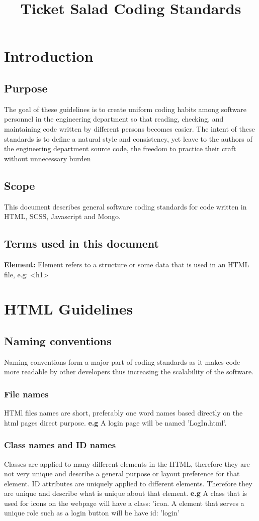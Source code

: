 \documentclass[11pt]{article}
\begin{document}
	\title{Ticket Salad Coding Standards}
	\date{}
	\maketitle
	
	\section{Introduction}
	\subsection{Purpose}
	The goal of these guidelines is to create uniform coding habits among software personnel in the
	engineering department so that reading, checking, and maintaining code written by different persons
	becomes easier. The intent of these standards is to define a natural style and consistency, yet leave
	to the authors of the engineering department source code, the freedom to practice their craft without
	unnecessary burden
	\subsection{Scope}
	This document describes general software coding standards for code written in HTML, SCSS, Javascript and Mongo.
	\subsection{Terms used in this document}
	\textbf{Element: }Element refers to a structure or some data that is used in an HTML file, e.g: <h1>
	\section{HTML Guidelines}
	\subsection{Naming conventions}
	Naming conventions form a major part of coding standards as it makes code more readable by other developers thus increasing the scalability of the software.
	\subsubsection{File names}
	HTMl files names are short, preferably one word names based directly on the html pages direct purpose.
	\textbf{e.g} A login page will be named 'LogIn.html'. 
	\subsubsection{Class names and ID names}
	Classes are applied to many different elements in the HTML, therefore they are not very unique and describe a general purpose or layout preference for that element.
	ID attributes are uniquely applied to different elements. Therefore they are unique and describe what is unique about that element. 
	\textbf{e.g} A class that is used for icons on the webpage will have a class: 'icon. A element that serves a unique role such as a login button will be have id: 'login'
\end{document}
